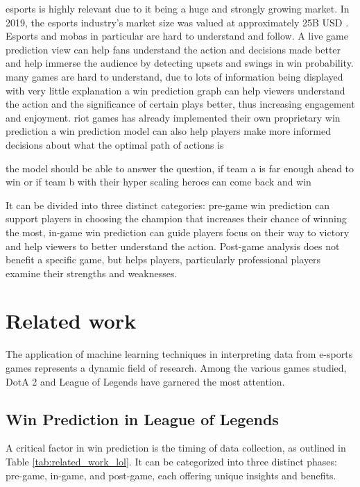 \documentclass[12pt, a4paper, headinclude, twoside, plainheadsepline, open=right, numbers=noenddot, hidelinks, toc=listof, toc=bibliography]{scrreprt}
\begin{document}
esports is highly relevant due to it being a huge and strongly growing market.
In 2019, the esports industry's market size was valued at approximately 25B USD \cite{ahnOneBillionDollar2020}.
Esports and mobas in particular are hard to understand and follow. A live game prediction view can help fans understand the action and decisions made better and help immerse the audience by detecting upsets and swings in win probability.
many games are hard to understand, due to lots of information being displayed with very little explanation
a win prediction graph can help viewers understand the action and the significance of certain plays better, thus increasing engagement and enjoyment.
riot games has already implemented their own proprietary win prediction
a win prediction model can also help players make more informed decisions about what the optimal path of actions is

the model should be able to answer the question, if team a is far enough ahead to win or if team b with their hyper scaling heroes can come back and win

It can be divided into three distinct categories: pre-game win prediction can support players in choosing the champion that increases their chance of winning the most, in-game win prediction can guide players focus on their way to victory and help viewers to better understand the action. 
Post-game analysis does not benefit a specific game, but helps players, particularly professional players examine their strengths and weaknesses.
\chapter{Related work}
\label{chap:related}

The application of machine learning techniques in interpreting data from e-sports games represents a dynamic field of research. 
Among the various games studied, DotA 2 and League of Legends have garnered the most attention.
\section{Win Prediction in League of Legends}
A critical factor in win prediction is the timing of data collection, as outlined in Table \ref{tab:related_work_lol}.
It can be categorized into three distinct phases: pre-game, in-game, and post-game, each offering unique insights and benefits.
\end{document}

